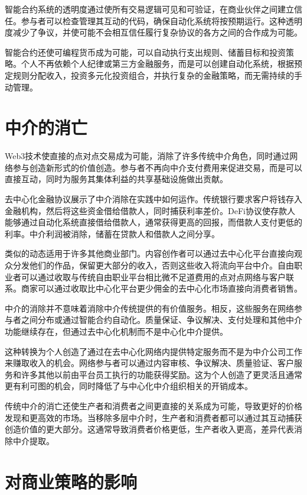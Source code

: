 \documentclass[
  Letterpaper,
]{scrbook}
\begin{document}
智能合约系统的透明度通过使所有交易逻辑可见和可验证，在商业伙伴之间建立信任。参与者可以检查管理其互动的代码，确保自动化系统将按预期运行。这种透明度减少了争议，并使可能不会相互信任履行复杂协议的各方之间的合作成为可能。

智能合约还使可编程货币成为可能，可以自动执行支出规则、储蓄目标和投资策略。个人不再依赖个人纪律或第三方金融服务，而是可以创建自动化系统，根据预定规则分配收入，投资多元化投资组合，并执行复杂的金融策略，而无需持续的手动管理。

\section{中介的消亡}\label{ux4e2dux4ecbux7684ux6d88ux4ea1}

Web3技术使直接的点对点交易成为可能，消除了许多传统中介角色，同时通过网络参与创造新形式的价值创造。参与者不再向中介支付费用来促进交易，而是可以直接互动，同时为服务其集体利益的共享基础设施做出贡献。

去中心化金融协议展示了中介消除在实践中如何运作。传统银行要求客户将钱存入金融机构，然后将这些资金借给借款人，同时捕获利率差价。DeFi协议使存款人能够通过自动化系统直接借给借款人，通常获得更高的回报，而借款人支付更低的利率。中介利润被消除，储蓄在贷款人和借款人之间分享。

类似的动态适用于许多其他商业部门。内容创作者可以通过去中心化平台直接向观众分发他们的作品，保留更大部分的收入，否则这些收入将流向平台中介。自由职业者可以通过收取与传统自由职业平台相比微不足道费用的点对点网络与客户联系。商家可以通过收取比中心化平台更少佣金的去中心化市场直接向消费者销售。

中介的消除并不意味着消除中介传统提供的有价值服务。相反，这些服务在网络参与者之间分布或通过智能合约自动化。质量保证、争议解决、支付处理和其他中介功能继续存在，但通过去中心化机制而不是中心化中介提供。

这种转换为个人创造了通过在去中心化网络内提供特定服务而不是为中介公司工作来赚取收入的机会。网络参与者可以通过内容审核、争议解决、质量验证、客户服务和许多其他以前由平台员工执行的功能获得奖励。这为个人创造了更灵活且通常更有利可图的机会，同时降低了与中心化中介组织相关的开销成本。

传统中介的消亡还使生产者和消费者之间更直接的关系成为可能，导致更好的价格发现和更高效的市场。当移除多层中介时，生产者和消费者都可以通过其互动捕获创造价值的更大部分。这通常导致消费者价格更低，生产者收入更高，差异代表消除中介提取。

\section{对商业策略的影响}\label{ux5bf9ux5546ux4e1aux7b56ux7565ux7684ux5f71ux54cd}
\end{document}
